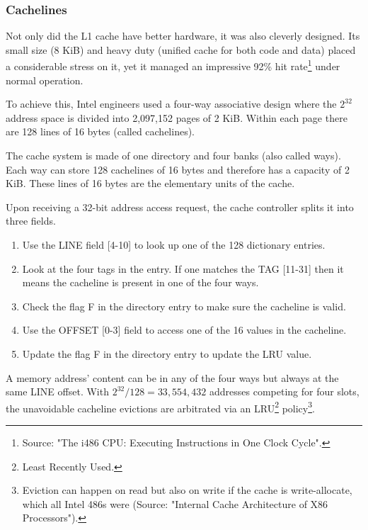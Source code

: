 \subsubsection{Cachelines}
Not only did the L1 cache have better hardware, it was also cleverly designed. Its small size (8 KiB) and heavy duty (unified cache for both code and data) placed a considerable stress on it, yet it managed an impressive 92\% hit rate\footnote{Source: "The i486 CPU: Executing Instructions in One Clock Cycle".} under normal operation.\\
\par
To achieve this, Intel engineers used a four-way associative design where the $2^{32}$ address space is divided into 2,097,152 pages of 2 KiB. Within each page there are 128 lines of 16 bytes (called cachelines).\\
\par
{}
\par
The cache system is made of one directory and four banks (also called ways). Each way can store 128 cachelines of 16 bytes and therefore has a capacity of 2 KiB. These lines of 16 bytes are the elementary units of the cache.\\
\par
Upon receiving a 32-bit address access request, the cache controller splits it into three fields.
\begin{enumerate}
\item Use the LINE field [4-10] to look up one of the 128 dictionary entries.
\item Look at the four tags in the entry. If one matches the TAG [11-31] then it means the cacheline is present in one of the four ways.
\item Check the flag F in the directory entry to make sure the cacheline is valid.
\item Use the OFFSET [0-3] field to access one of the 16 values in the cacheline.
\item Update the flag F in the directory entry to update the LRU value.
\end{enumerate}
\par
A memory address' content can be in any of the four ways but always at the same LINE offset. With $2^{32} / 128 = 33,554,432$ addresses competing for four slots, the unavoidable cacheline evictions are arbitrated via an LRU\footnote{Least Recently Used.} policy\footnote{Eviction can happen on read but also on write if the cache is write-allocate, which all Intel 486s were (Source: "Internal Cache Architecture of X86 Processors").}.\\
